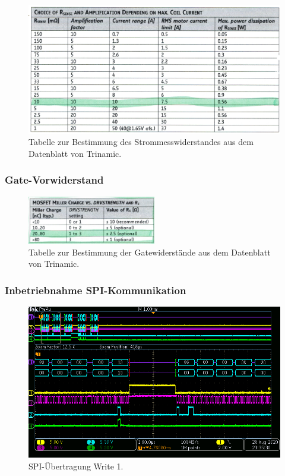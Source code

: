 \begin{figure}[H]
	\centering
	\includegraphics[width=\textwidth]{graphics/Tabelle_Shunts.png}
	\caption{Tabelle zur Bestimmung des Strommesswiderstandes aus dem Datenblatt von Trinamic.\cite[S.31]{trinamicmotion_control_gmbh__co_kg_tmc6200_2019}}
	\label{fig:Tabelle_Shunts}
\end{figure}

\subsubsection{Gate-Vorwiderstand}\label{Appendix:Gate_Vorwiderstand}

\begin{figure}[H]
	\centering
	\includegraphics[width=0.5\textwidth]{graphics/Tabelle_Gatewiderstaende.png}
	\caption{Tabelle zur Bestimmung der Gatewiderstände aus dem Datenblatt von Trinamic.\cite[S.13]{trinamicmotion_control_gmbh__co_kg_tmc6200_2019}}
	\label{fig:Tabelle_Gatewiderstaende}
\end{figure}

\subsubsection{Inbetriebnahme SPI-Kommunikation}\label{Appendix:TMC6200_SPI}

\begin{figure}[H]
\center
\includegraphics[width = \textwidth]{graphics/TMC6200_Beschreiben2}
\caption{SPI-Übertragung Write 1.}
\label{fig:TMC6200_Beschreiben2}
\end{figure}

